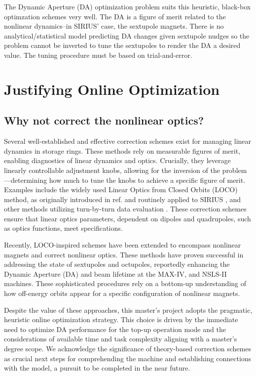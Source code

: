 The Dynamic Aperture (DA) optimization problem suits this heuristic, black-box optimzation schemes very well. The DA is a figure of merit related to the nonlinear dynamics--in SIRIUS' case, the sextupole magnets. There is no analytical/statistical model predicting DA changes given sextupole nudges so the problem cannot be inverted to tune the sextupoles to render the DA a desired value. The tuning procedure must be based on trial-and-error.

\section{Justifying Online Optimization}
\subsection{Why not correct the nonlinear optics?}
Several well-established and effective correction schemes exist for managing linear dynamics in storage rings. These methods rely on measurable figures of merit, enabling diagnostics of linear dynamics and optics. Crucially, they leverage linearly controllable adjustment knobs, allowing for the inversion of the problem—determining how much to tune the knobs to achieve a specific figure of merit. Examples include the widely used Linear Optics from Closed Orbits (LOCO) method, as originally introduced in ref.\cite{safranek_experimental_1997} and routinely applied to SIRIUS \cite{alves_linear_2021, alves_optics_2021}, and other methods utilizing turn-by-turn data evaluation \cite[chapter 5]{huang_beam-based_2019}. These correction schemes ensure that linear optics parameters, dependent on dipoles and quadrupoles, such as optics functions, meet specifications.

Recently, LOCO-inspired schemes have been extended to encompass nonlinear magnets and correct nonlinear optics. These methods have proven successful in addressing the state of sextupoles and octupoles, reportedly enhancing the Dynamic Aperture (DA) and beam lifetime at the MAX-IV, \cite{olsson_nonlinear_2020} and NSLS-II \cite{li_nonlinear_2024} machines. These sophisticated procedures rely on a bottom-up understanding of how off-energy orbits appear for a specific configuration of nonlinear magnets.

Despite the value of these approaches, this master's project adopts the pragmatic, heuristic online optimization strategy. This choice is driven by the immediate need to optimize DA performance for the top-up operation mode and the considerations of available time and task complexity aligning with a master's degree scope. We acknowledge the significance of theory-based correction schemes as crucial next steps for comprehending the machine and establishing connections with the model, a pursuit to be completed in the near future.


